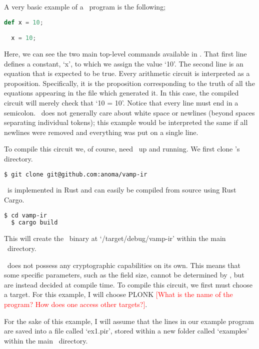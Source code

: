 A very basic example of a \vampir\ program is the following;

\begin{lstlisting}[language=Python]
  def x = 10;

  x = 10;
\end{lstlisting}

Here, we can see the two main top-level commands available in \vampir. That first line defines a constant, `x', to which we assign the value `10'. The second line is an equation that is expected to be true. Every arithmetic circuit is interpreted as a proposition. Specifically, it is the proposition corresponding to the truth of all the equations appearing in the file which generated it. In this case, the compiled circuit will merely check that `10 = 10'. Notice that every line must end in a semicolon. \vampir\ does not generally care about white space or newlines (beyond spaces separating individual tokens); this example would be interpreted the same if all newlines were removed and everything was put on a single line.

To compile this circuit we, of course, need \vampir\ up and running. We first clone \vampir's directory.

\begin{lstlisting}[language=bash]
  $ git clone git@github.com:anoma/vamp-ir
\end{lstlisting}

\vampir\ is implemented in Rust and can easily be compiled from source using Rust Cargo.

\begin{lstlisting}[language=bash]
  $ cd vamp-ir
  $ cargo build
\end{lstlisting}

This will create the \vampir\ binary at `/target/debug/vamp-ir' within the main \vampir\ directory.

\vampir\ does not possess any cryptographic capabilities on its own. This means that some specific parameters, such as the field size, cannot be determined by \vampir, but are instead decided at compile time. To compile this circuit, we first must choose a target. For this example, I will choose PLONK \textcolor{red}{[What is the name of the program? How does one access other targets?]}.

For the sake of this example, I will assume that the lines in our example program are saved into a file called `ex1.pir', stored within a new folder called `examples' within the main \vampir\ directory. 


